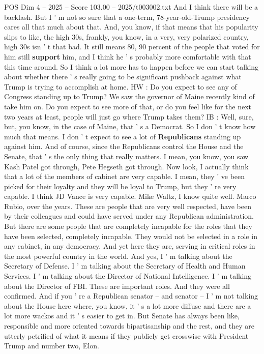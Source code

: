 \begin{textsample}{POS Dim 4 – 2025 – Score 103.00 – 2025/t003002.txt}
And I think there will be a backlash.
But I ' m not so sure that a one-term, 78-year-old-Trump presidency cares all that much about that.
And, you know, if that means that his popularity slips to like, the high 30s, frankly, you know, in a very, very polarized country, high 30s isn ' t that bad.
It still means 80, 90 percent of the people that voted for him still \textbf{support} him, and I think he ' s probably more comfortable with that this time around.
So I think a lot more has to happen before we can start talking about whether there ' s really going to be significant pushback against what Trump is trying to accomplish at home.
HW : Do you expect to see any of Congress standing up to Trump?
We saw the governor of Maine recently kind of take him on.
Do you expect to see more of that, or do you feel like for the next two years at least, people will just go where Trump takes them?
IB : Well, sure, but, you know, in the case of Maine, that ' s a Democrat.
So I don ' t know how much that means.
I don ' t expect to see a lot of \textbf{Republicans} standing up against him.
And of course, since the Republicans control the House and the Senate, that ' s the only thing that really matters.
I mean, you know, you saw Kash Patel got through, Pete Hegseth got through.
Now look, I actually think that a lot of the members of cabinet are very capable.
I mean, they ' ve been picked for their loyalty and they will be loyal to Trump, but they ' re very capable.
I think JD Vance is very capable.
Mike Waltz, I know quite well.
Marco Rubio, over the years.
These are people that are very well respected, have been by their colleagues and could have served under any Republican administration.
But there are some people that are completely incapable for the roles that they have been selected, completely incapable.
They would not be selected in a role in any cabinet, in any democracy.
And yet here they are, serving in critical roles in the most powerful country in the world.
And yes, I ' m talking about the Secretary of Defense.
I ' m talking about the Secretary of Health and Human Services.
I ' m talking about the Director of National Intelligence.
I ' m talking about the Director of FBI.
These are important roles.
And they were all confirmed.
And if you ' re a Republican senator -- and senator -- I ' m not talking about the House here where, you know, it ' s a lot more diffuse and there are a lot more wackos and it ' s easier to get in.
But Senate has always been like, responsible and more oriented towards bipartisanship and the rest, and they are utterly petrified of what it means if they publicly get crosswise with President Trump and number two, Elon.

\end{textsample}
